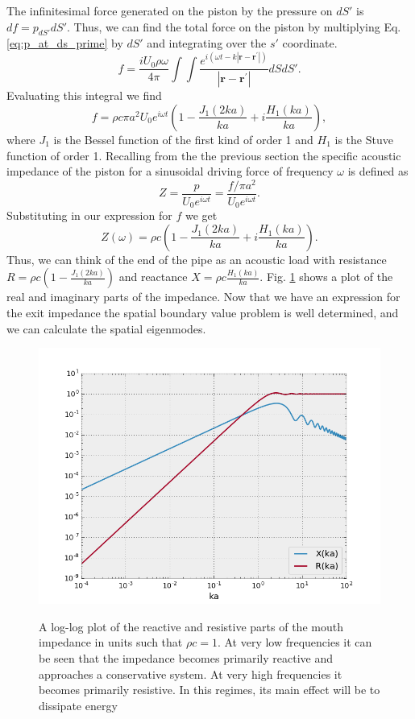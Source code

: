 \documentclass[12pt, letter]{report}
\begin{document}
The infinitesimal force generated on the piston by the pressure on $dS'$ is $df = p_{dS'} dS'$. Thus, we can find the total force on the piston by multiplying Eq. \ref{eq:p_at_ds_prime} by $dS'$ and integrating over the $s'$ coordinate.
\begin{equation}
f = \frac{i U_0 \rho \omega}{4 \pi} \int \int \frac{e^{i(\omega t-k|\textbf{r}-\textbf{r}^\prime|)}}{|\textbf{r}-\textbf{r}^\prime|} dS dS'.
\end{equation}
Evaluating this integral we find
\begin{equation}
f=\rho c \pi a^2 U_0 e^{i \omega t} \left(1 - \frac{J_1(2ka)}{ka} + i \frac{H_1(ka)}{ka} \right),
\end{equation}
where $J_1$ is the Bessel function of the first kind of order 1 and $H_1$ is the Stuve function of order 1. Recalling from the the previous section the specific acoustic impedance of the piston for a sinusoidal driving force of frequency $\omega$ is defined as 
\begin{equation}
Z = \frac{p}{U_0 e^{i \omega t}} = \frac{f/ \pi a^2 }{U_0 e^{i \omega t}}.
\end{equation}
Substituting in our expression for $f$ we get
\begin{equation}
\label{eq:mouth_impedance}
Z(\omega) = \rho c \left(1 - \frac{J_1(2ka)}{ka} + i \frac{H_1(ka)}{ka} \right).
\end{equation}
Thus, we can think of the end of the pipe as an acoustic load with resistance $R = \rho c \left(1 - \frac{J_1(2 k a)}{k a} \right)$ and reactance $X = \rho c \frac{H_1(k a)}{k a}$. Fig. \ref{fig:impedance} shows a plot of the real and imaginary parts of the impedance. Now that we have an expression for the exit impedance the spatial boundary value problem is well determined, and we can calculate the spatial eigenmodes.
\begin{figure}
\centering
\includegraphics[width=\linewidth]{impedance.png}
\label{fig:impedance}
\caption{A log-log plot of the reactive and resistive parts of the mouth impedance in units such that $\rho c = 1$. At very low frequencies it can be seen that the impedance becomes primarily reactive and approaches a conservative system. At very high frequencies it becomes primarily resistive. In this regimes, its main effect will be to dissipate energy}
\end{figure}
\end{document}
